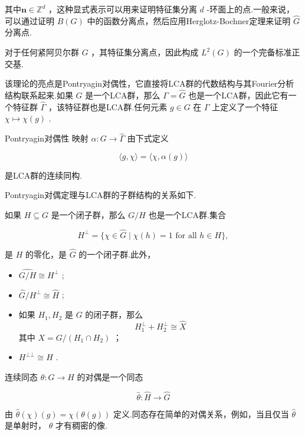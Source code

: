\documentclass[lang=cn,a4paper,11pt,openany,scheme=chinese]{elegantbook}
\begin{document}
其中\(\mathbf{n} \in  {\mathbb{Z}}^{d}\) ，这种显式表示可以用来证明特征集分离 \(d\) -环面上的点.一般来说，可以通过证明 \(B\left( G\right)\) 中的函数分离点，然后应用Herglotz-Bochner定理来证明 \(\widehat{G}\) 分离点.
\begin{theorem}{}
    对于任何紧阿贝尔群 \(G\) ，其特征集分离点，因此构成 \({L}^{2}\left( G\right)\) 的一个完备标准正交基.
\end{theorem}
该理论的亮点是Pontryagin对偶性，它直接将LCA群的代数结构与其Fourier分析结构联系起来.如果 \(G\) 是一个LCA群，那么 \(\Gamma  = \widehat{G}\) 也是一个LCA群，因此它有一个特征群 \(\widehat{\Gamma }\) ，该特征群也是LCA群.任何元素 \(g \in  G\) 在 \(\Gamma\) 上定义了一个特征 \(\chi  \mapsto  \chi \left( g\right)\) .
\begin{theorem}{Pontryagin对偶性}
    映射 \(\alpha  : G \rightarrow  \widehat{\Gamma }\) 由下式定义

\[
\langle g,\chi \rangle  = \langle \chi ,\alpha \left( g\right) \rangle
\]

是LCA群的连续同构.
\end{theorem}
Pontryagin对偶定理与LCA群的子群结构的关系如下.
\begin{theorem}{}
    如果 \(H \subseteq  G\) 是一个闭子群，那么 \(G/H\) 也是一个LCA群.集合

\[
{H}^{ \bot  } = \{ \chi  \in  \widehat{G} \mid  \chi \left( h\right)  = 1\text{ for all }h \in  H\} ,
\]

是 \(H\) 的零化，是 \(\widehat{G}\) 的一个闭子群.此外，

\begin{itemize}
\item \(\widehat{G/H} \cong  {H}^{ \bot  }\) ;
\item \(\widehat{G}/{H}^{ \bot  } \cong  \widehat{H}\) ;
\item 如果 \({H}_{1},{H}_{2}\) 是 \(G\) 的闭子群，那么
\[
{H}_{1}^{ \bot  } + {H}_{2}^{ \bot  } \cong  \widehat{X}
\]
其中 \(X = G/\left( {{H}_{1} \cap  {H}_{2}}\right)\) ；
\item \({H}^{ \bot   \bot  } \cong  H\) .
\end{itemize}
\end{theorem}
连续同态 \(\theta  : G \rightarrow  H\) 的对偶是一个同态

\[
\widehat{\theta } : \widehat{H} \rightarrow  \widehat{G}
\]

由 \(\widehat{\theta }\left( \chi \right) \left( g\right)  = \chi \left( {\theta \left( g\right) }\right)\) 定义.同态存在简单的对偶关系，例如，当且仅当 \(\widehat{\theta }\) 是单射时， \(\theta\) 才有稠密的像.
\end{document}
